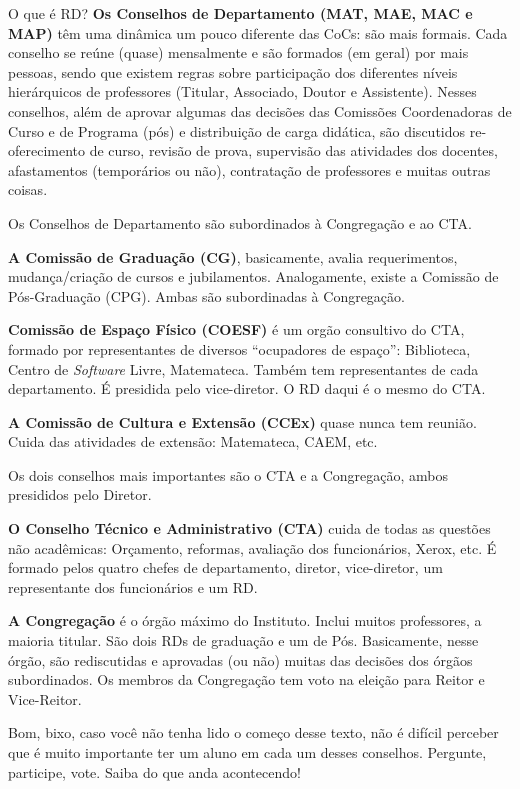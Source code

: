 \begin{secao}{O que é RD?}
{\bf Os Conselhos de Departamento (MAT, MAE, MAC e MAP)} têm uma dinâmica um
pouco diferente das CoCs: são mais formais. Cada conselho se reúne (quase)
mensalmente e são formados (em geral) por mais pessoas, sendo que existem
regras sobre participação dos diferentes níveis hierárquicos de
professores (Titular, Associado, Doutor e Assistente). Nesses conselhos, além
de aprovar algumas das decisões das Comissões Coordenadoras de Curso e de
Programa (pós) e distribuição de carga didática, são discutidos re-oferecimento
de curso, revisão de prova, supervisão das atividades dos docentes,
afastamentos (temporários ou não), contratação de professores e muitas outras
coisas.

Os Conselhos de Departamento são subordinados à Congregação e ao CTA.

{\bf A Comissão de Graduação (CG)}, basicamente, avalia requerimentos,
mudança/criação de cursos e jubilamentos. Analogamente, existe a Comissão de
Pós-Graduação (CPG). Ambas são subordinadas à Congregação.

{\bf Comissão de Espaço Físico (COESF)} é um orgão consultivo do CTA, formado
por representantes de diversos ``ocupadores de espaço'': Biblioteca, Centro de
\textit{Software} Livre, Matemateca. Também tem representantes de cada departamento. É
presidida pelo vice-diretor. O RD daqui é o mesmo do CTA.

{\bf A Comissão de Cultura e Extensão (CCEx)} quase nunca tem reunião. Cuida
das atividades de extensão: Matemateca, CAEM, etc.

Os dois conselhos mais importantes são o CTA e a Congregação, ambos presididos
pelo Diretor.

{\bf O Conselho Técnico e Administrativo (CTA)} cuida de todas as questões não
acadêmicas: Orçamento, reformas, avaliação dos funcionários, Xerox, etc. É 
formado pelos quatro chefes de departamento, diretor, vice-diretor, um
representante dos funcionários e um RD.

{\bf A Congregação} é o órgão máximo do Instituto. Inclui muitos professores, a
maioria titular. São dois RDs de graduação e um de Pós. Basicamente,
nesse órgão, são rediscutidas e aprovadas (ou não) muitas das decisões
dos órgãos subordinados. Os membros da Congregação tem voto na eleição para
Reitor e Vice-Reitor.

Bom, bixo, caso você não tenha lido o começo desse texto, não é difícil
perceber que é muito importante ter um aluno em cada um desses conselhos.
Pergunte, participe, vote. Saiba do que anda acontecendo!

\end{secao}
